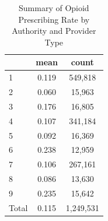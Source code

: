\begin{table}[htbp]\centering
\def\sym#1{\ifmmode^{#1}\else\(^{#1}\)\fi}
\caption{Summary of Opioid Prescribing Rate by Authority and Provider Type}
\begin{tabular}{l*{1}{cc}}
\toprule
                    &        mean&       count\\
\midrule
1                   &       0.119&     549,818\\
2                   &       0.060&      15,963\\
3                   &       0.176&      16,805\\
4                   &       0.107&     341,184\\
5                   &       0.092&      16,369\\
6                   &       0.238&      12,959\\
7                   &       0.106&     267,161\\
8                   &       0.086&      13,630\\
9                   &       0.235&      15,642\\
Total               &       0.115&   1,249,531\\
\bottomrule
\end{tabular}
\end{table}
